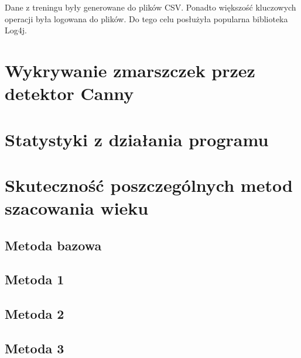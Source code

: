 \documentclass[a4paper,twoside,12pt]{book}
\begin{document}
    Dane z treningu były generowane do plików CSV. Ponadto większość kluczowych operacji była logowana do plików. Do
    tego celu posłużyła popularna biblioteka Log4j.
    \section{Wykrywanie zmarszczek przez detektor Canny}\label{sec:wykrywanie-krawędzi-przez-detektor-canny}
    \section{Statystyki z działania programu}\label{sec:statystyki-z-działania-programu}


    \section{Skuteczność poszczególnych metod szacowania wieku}\label{sec:skuteczność-poszczególnych-metod-szacowania-wieku}
    \subsection{Metoda bazowa}
    \subsection{Metoda 1}
    \subsection{Metoda 2}
    \subsection{Metoda 3}
\end{document}
